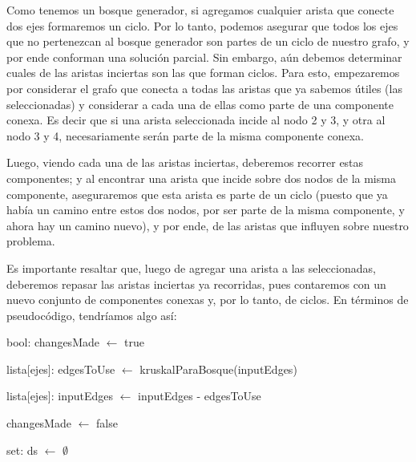 Como tenemos un bosque generador, si agregamos cualquier arista que conecte dos ejes formaremos un ciclo. Por lo tanto, podemos asegurar que todos los ejes que no pertenezcan al bosque generador son partes de un ciclo de nuestro grafo, y por ende conforman una solución parcial. Sin embargo, aún debemos determinar cuales de las aristas inciertas son las que forman ciclos. Para esto, empezaremos por considerar el grafo que conecta a todas las aristas que ya sabemos útiles (las seleccionadas) y considerar a cada una de ellas como parte de una componente conexa. Es decir que si una arista seleccionada incide al nodo 2 y 3, y otra al nodo 3 y 4, necesariamente serán parte de la misma componente conexa.

Luego, viendo cada una de las aristas inciertas, deberemos recorrer estas componentes; y al encontrar una arista que incide sobre dos nodos de la misma componente, aseguraremos que esta arista es parte de un ciclo (puesto que ya había un camino entre estos dos nodos, por ser parte de la misma componente, y ahora hay un camino nuevo), y por ende, de las aristas que influyen sobre nuestro problema.

Es importante resaltar que, luego de agregar una arista a las seleccionadas, deberemos repasar las aristas inciertas ya recorridas, pues contaremos con un nuevo conjunto de componentes conexas y, por lo tanto, de ciclos. En términos de pseudocódigo, tendríamos algo así:

\begin{algorithm}[H]
	\NoCaptionOfAlgo
	\caption{}
	
	bool: changesMade $\leftarrow$ true
	
	lista[ejes]: edgesToUse $\leftarrow$ kruskalParaBosque(inputEdges)

	lista[ejes]: inputEdges $\leftarrow$ inputEdges - edgesToUse

	 {
		changesMade $\leftarrow$ false

		set: ds $\leftarrow$ $\emptyset$



	}
\end{algorithm}

